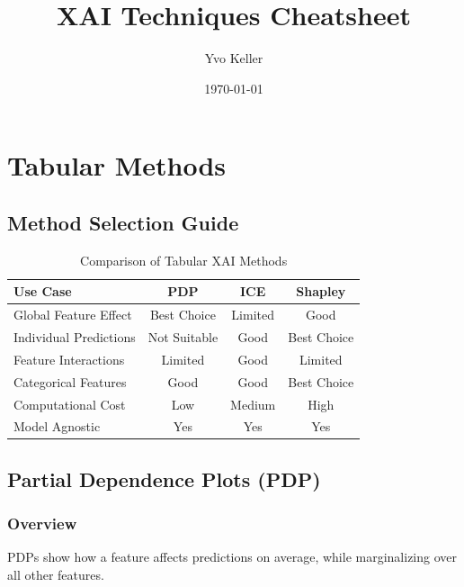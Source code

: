 \documentclass{article}
\title{XAI Techniques Cheatsheet}
\author{Yvo Keller}
\date{\today}
\begin{document}
\maketitle

\pagebreak
\section{Tabular Methods}

\subsection{Method Selection Guide}
\begin{table}[h]
\caption{Comparison of Tabular XAI Methods}
\begin{center}
\small
\begin{tabular}{|l|c|c|c|}
\hline
\textbf{Use Case} & \textbf{PDP} & \textbf{ICE} & \textbf{Shapley} \\
\hline
Global Feature Effect & Best Choice & Limited & Good \\
\hline
Individual Predictions & Not Suitable & Good & Best Choice \\
\hline
Feature Interactions & Limited & Good & Limited \\
\hline
Categorical Features & Good & Good & Best Choice \\
\hline
Computational Cost & Low & Medium & High \\
\hline
Model Agnostic & Yes & Yes & Yes \\
\hline
\end{tabular}
\end{center}
\end{table}

\subsection{Partial Dependence Plots (PDP)}

\subsubsection{Overview}
PDPs show how a feature affects predictions on average, while marginalizing over all other features.
\end{document}
